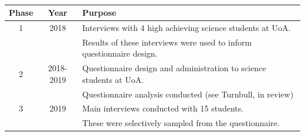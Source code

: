 \documentclass[a4paper,man,natbib]{apa6}
\begin{document}
\begin{table}[ht]
\begin{tabular}{c|c|l}
                      
Phase  & Year & Purpose    \\ \hline
1   & 2018  & Interviews with 4 high achieving science students at UoA.     \\
& & Results of these interviews were used to inform questionnaire design. \\ \hline
2  & 2018-2019 & Questionnaire design and administration to science students at UoA.  \\
& & Questionnaire analysis conducted (see Turnbull, in review)\\ \hline
3 & 2019 & Main interviews conducted with 15 students. \\
& & These were selectively sampled from the questionnaire. \\ \hline
\end{tabular}
\caption{\label{tab:Phases} }
\end{table}
\end{document}

